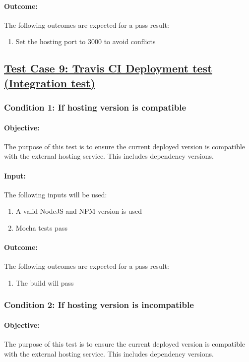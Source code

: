 \documentclass{article}
\begin{document}
\paragraph{Outcome:} The following outcomes are expected for a pass result:
\begin{enumerate}
	\item Set the hosting port to 3000 to avoid conflicts
\end{enumerate}

\pagebreak

\subsection{\underline{Test Case 9: Travis CI Deployment test (Integration test) }}\label{test9}
\subsubsection{Condition 1: If hosting version is compatible}
\paragraph{Objective:} The purpose of this test is to ensure the current deployed version is compatible with the external hosting service. This includes dependency versions.
\paragraph{Input:} The following inputs will be used:
\begin{enumerate}
	\item A valid NodeJS and NPM version is used
	\item Mocha tests pass
\end{enumerate}
\paragraph{Outcome:} The following outcomes are expected for a pass result:
\begin{enumerate}
	\item The build will pass
\end{enumerate}
\subsubsection{Condition 2: If hosting version is incompatible}
\paragraph{Objective:} The purpose of this test is to ensure the current deployed version is compatible with the external hosting service. This includes dependency versions.
\end{document}
